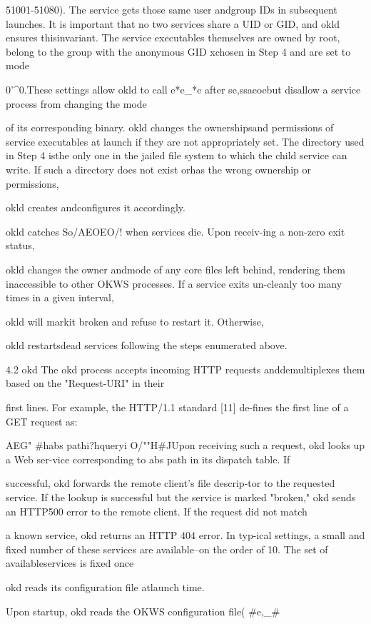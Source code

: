 51001-51080). The service gets those same user andgroup IDs in subsequent launches. It is important that no
two services share a UID or GID, and okld ensures thisinvariant. The service executables themselves are owned
by root, belong to the group with the anonymous GID xchosen in Step 4 and are set to mode

0'^0.These settings allow okld to call
e*e_*e after se,ssaeoebut disallow a service process from changing the mode

of its corresponding binary. okld changes the ownershipsand permissions of service executables at launch if they
are not appropriately set. The directory used in Step 4 isthe only one in the jailed file system to which the child
service can write. If such a directory does not exist orhas the wrong ownership or permissions,

okld creates andconfigures it accordingly.

okld catches So/AEOEO/! when services die. Upon receiv-ing a non-zero exit status,

okld changes the owner andmode of any core files left behind, rendering them inaccessible to other OKWS processes. If a service exits un-cleanly too many times in a given interval,

okld will markit broken and refuse to restart it. Otherwise,

okld restartsdead services following the steps enumerated above.

4.2 okd
The okd process accepts incoming HTTP requests anddemultiplexes them based on the "Request-URI" in their

first lines. For example, the HTTP/1.1 standard [11] de-fines the first line of a GET request as:

AEG" #habs pathi?hqueryi O/""H#^^
Upon receiving such a request, okd looks up a Web ser-vice corresponding to abs path in its dispatch table. If

successful, okd forwards the remote client's file descrip-tor to the requested service. If the lookup is successful
but the service is marked "broken," okd sends an HTTP500 error to the remote client. If the request did not match

a known service, okd returns an HTTP 404 error. In typ-ical settings, a small and fixed number of these services
are available--on the order of 10. The set of availableservices is fixed once

okd reads its configuration file atlaunch time.

Upon startup, okd reads the OKWS configuration file(
#e,_#%

